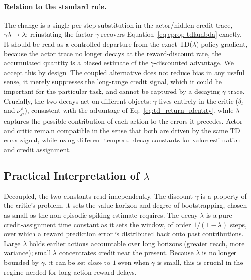 \paragraph{Relation to the standard rule.}
The change is a single per-step substitution in the actor/hidden credit
trace, $\gamma\lambda \to \lambda$; reinstating the factor $\gamma$ recovers
Equation~\eqref{eq:eprop-tdlambda} exactly. It should be read as a controlled
departure from the exact TD($\lambda$) policy gradient, because the actor
trace no longer decays at the reward-discount rate, the accumulated quantity
is a biased estimate of the $\gamma$-discounted advantage. We accept
this by design. The coupled alternative does not reduce bias in any useful
sense, it merely suppresses the long-range credit signal, which it could be important for 
the particular task, and cannot be captured by a decaying $\gamma$ trace. 
Crucially, the two decays act on different objects: $\gamma$ lives entirely in the critic
($\delta_t$ and $\nu^{\,t}_{ji}$), consistent with the advantage of
Eq.~\eqref{eq:td_return_identity}, while $\lambda$ captures the possible 
contribution of each action to the errors it precedes. 
Actor and critic remain compatible in the sense that both are driven by the same TD error signal, while using different temporal decay constants for value estimation and credit assignment.

\subsection{Practical Interpretation of $\lambda$}
\label{sec:practical-lambda}

Decoupled, the two constants read independently. The discount $\gamma$ is a
property of the critic's problem, it sets the value horizon and degree
of bootstrapping, chosen as small as the non-episodic spiking estimate
requires. The decay $\lambda$ is a pure credit-assignment time constant as 
it sets the window, of order $1/(1-\lambda)$ steps, 
over which a reward prediction error is distributed
back onto past contributions. Large $\lambda$ holds earlier actions
accountable over long horizons (greater reach, more variance); small
$\lambda$ concentrates credit near the present. Because $\lambda$ is no longer
bounded by $\gamma$, it can be set close to $1$ even when $\gamma$ is small, this is
crucial in the regime needed for long action-reward delays.

